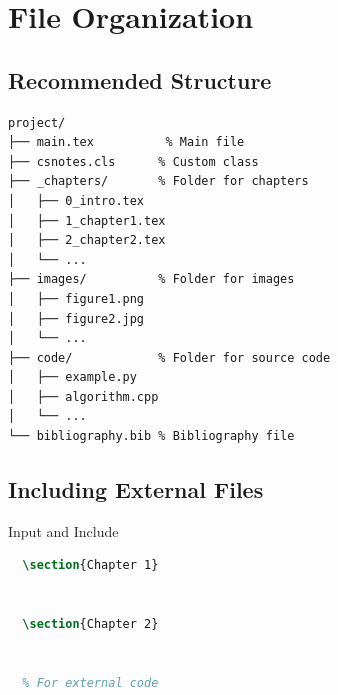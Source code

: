 \documentclass[]{csnotes}
\begin{document}

\section{File Organization}

\subsection{Recommended Structure}

\begin{lstlisting}[language=bash]
project/
├── main.tex          % Main file
├── csnotes.cls      % Custom class
├── _chapters/       % Folder for chapters
│   ├── 0_intro.tex
│   ├── 1_chapter1.tex
│   ├── 2_chapter2.tex
│   └── ...
├── images/          % Folder for images
│   ├── figure1.png
│   ├── figure2.jpg
│   └── ...
├── code/            % Folder for source code
│   ├── example.py
│   ├── algorithm.cpp
│   └── ...
└── bibliography.bib % Bibliography file
\end{lstlisting}

\subsection{Including External Files}

\begin{example}{Input and Include}
  \begin{lstlisting}[language=TeX]
  % In main.tex
  \section{Chapter 1}
  

  \section{Chapter 2}
  

  % For external code
  
  \end{lstlisting}
\end{example}

\end{document}
